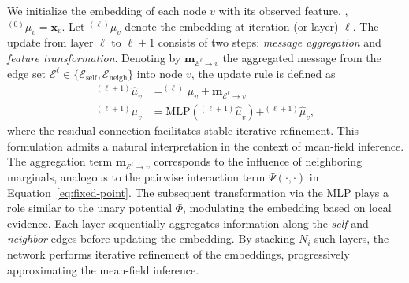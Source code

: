 We initialize the embedding of each node $v$ with its observed feature, \ie, $^{(0)}\mu_v = \mathbf{x}_v$.
Let $^{(\ell)}\mu_v$ denote the embedding at iteration (or layer) $\ell$.
The update from layer $\ell$ to $\ell+1$ consists of two steps: \emph{message aggregation} and \emph{feature transformation}.
Denoting by $\mathbf{m}_{\mathcal{E}^\ell \rightarrow v}$ the aggregated message from the edge set $\mathcal{E}^\ell \in \{\mathcal{E}_{\mathrm{self}}, \mathcal{E}_{\mathrm{neigh}}\}$ into node $v$, the update rule is defined as
\begin{equation}
	\begin{aligned}
		^{(\ell+1)}\hat{\mu}_v &= ^{(\ell)}\mu_v + \mathbf{m}_{\mathcal{E}^\ell \rightarrow v}\\
		^{(\ell+1)}\mu_v &= \mathrm{MLP}\left(^{(\ell+1)}\hat{\mu}_v\right) + ^{(\ell+1)}\hat{\mu}_v,
	\end{aligned}
	\label{eq:msg-passing}
\end{equation}
where the residual connection facilitates stable iterative refinement.
This formulation admits a natural interpretation in the context of mean-field inference. The aggregation term $\mathbf{m}_{\mathcal{E}^\ell \rightarrow v}$ corresponds to the influence of neighboring marginals, analogous to the pairwise interaction term $\Psi(\cdot,\cdot)$ in Equation~\ref{eq:fixed-point}. The subsequent transformation via the MLP plays a role similar to the unary potential $\Phi$, modulating the embedding based on local evidence.
Each layer sequentially aggregates information along the \emph{self} and \emph{neighbor} edges before updating the embedding.
By stacking $N_i$ such layers, the network performs iterative refinement of the embeddings, progressively approximating the mean-field inference.

